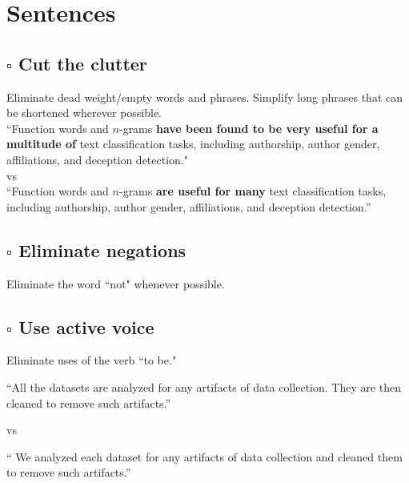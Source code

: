 \documentclass{article}
\begin{document}
\section*{Sentences}
\begin{adjustwidth}{1cm}{}
    \subsection*{$\square$ Cut the clutter}

    \begin{adjustwidth}{1cm}{}
        Eliminate dead weight/empty words and phrases. Simplify long phrases that can be shortened wherever possible.
        \\
        
        ``Function words and $n$-grams \textbf{have been found to be very useful for a multitude of} text classification tasks, including authorship, author gender, affiliations, and deception detection."
        \\

        vs 
        \\

        ``Function words and $n$-grams \textbf{are useful for many} text classification tasks, including authorship, author gender, affiliations, and deception detection.''
    \end{adjustwidth}

    \subsection*{$\square$ Eliminate negations}

    \begin{adjustwidth}{1cm}{}
        Eliminate the word ``not" whenever possible. 
    \end{adjustwidth}

    \subsection*{$\square$ Use active voice}

    \begin{adjustwidth}{1cm}{}
        Eliminate uses of the verb ``to be."

        ``All the datasets are analyzed for any artifacts of data collection. They are then cleaned to remove such artifacts.''

        vs 

        `` We analyzed each dataset for any artifacts of data collection and cleaned them to remove such artifacts.''
    \end{adjustwidth}


\end{adjustwidth}
\end{document}
